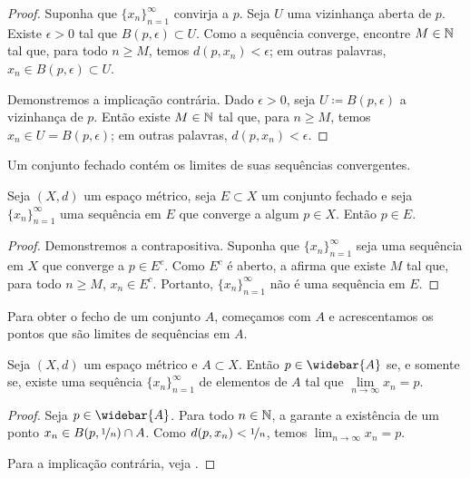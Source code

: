 \begin{proof}
Suponha que $\{ x_n \}_{n=1}^\infty$ convirja a $p$. Seja $U$ uma vizinhança
aberta de $p$. Existe $\epsilon > 0$ tal que $B(p,\epsilon) \subset
U$. Como a sequência converge, encontre $M \in {\mathbb{N}}$ tal que, para todo $n \geq
M$, temos $d(p,x_n) < \epsilon$; em outras palavras,
$x_n \in B(p,\epsilon) \subset U$.

Demonstremos a implicação contrária. Dado $\epsilon > 0$, seja
$U \coloneqq B(p,\epsilon)$ a vizinhança de $p$. Então existe $M \in {\mathbb{N}}$
tal que, para $n \geq M$, temos $x_n \in U = B(p,\epsilon)$; em outras
palavras, $d(p,x_n) < \epsilon$.
\end{proof}

Um conjunto fechado contém os limites de suas sequências convergentes.

\begin{prop} \label{prop:msclosedlim}
Seja $(X,d)$ um espaço métrico, seja $E \subset X$ um conjunto fechado
e seja $\{ x_n \}_{n=1}^\infty$ uma sequência em $E$ que converge a algum
$p \in X$. Então $p \in E$.
\end{prop}

\begin{proof}
Demonstremos a contrapositiva.
Suponha que $\{ x_n \}_{n=1}^\infty$ seja uma sequência em $X$ que converge
a $p \in E^c$.
Como $E^c$ é aberto, a  afirma que existe
$M$ tal que, para todo $n \geq M$,
$x_n \in E^c$. Portanto, $\{ x_n \}_{n=1}^\infty$ não é uma sequência em $E$.
\end{proof}

Para obter o fecho de um conjunto $A$, começamos com $A$ e acrescentamos
os pontos que são limites de sequências em $A$.

\begin{prop} \label{prop:msclosureapprseq}
Seja $(X,d)$ um espaço métrico e $A \subset X$.
Então $p \in \widebar{A}$ se, e somente se, existe uma sequência
$\{ x_n \}_{n=1}^\infty$ de elementos de $A$ tal que
$\lim\limits_{n\to\infty} x_n = p$.
\end{prop}

\begin{proof}
Seja $p \in \widebar{A}$. Para todo $n \in {\mathbb{N}}$,
a  garante a existência
de um ponto $x_n \in B(p,\nicefrac{1}{n}) \cap A$.
Como $d(p,x_n) < \nicefrac{1}{n}$, temos $\lim_{n\to\infty} x_n = p$.

Para a implicação contrária, veja .
\end{proof}

